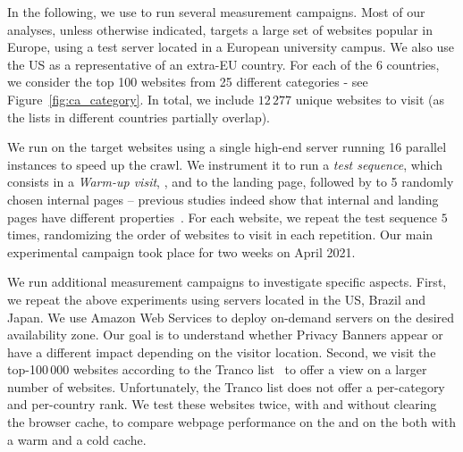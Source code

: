 In the following, we use \TOOL to run several measurement campaigns. Most of our analyses, unless otherwise indicated, targets a large set of websites popular in Europe, using a test server located in a European university campus. We also use the US as a representative of an extra-EU country. For each of the $6$ countries, we consider the top 100 websites from 25 different categories - see Figure~\ref{fig:ca_category}. In total, we include $12\,277$ unique websites to visit (as the lists in different countries partially overlap).

We run \TOOL on the target websites using a single high-end server running 16 parallel instances to speed up the crawl. We instrument it to run a \emph{test sequence}, which consists in a \emph{Warm-up visit}, \BEFORE, and \AFTER to the landing page, followed by \INTERNAL to 5 randomly chosen internal pages -- previous studies indeed show that internal and landing pages have different properties~\cite{aqeel2020on}. For each website, we repeat the test sequence $5$ times, randomizing the order of websites to visit in each repetition.  Our main experimental campaign took place for two weeks on April 2021.

We run additional measurement campaigns to investigate specific aspects. First, we repeat the above experiments using servers located in the US, Brazil and Japan. We use Amazon Web Services to deploy on-demand servers on the desired availability zone. Our goal is to understand whether Privacy Banners appear or have a different impact depending on the visitor location. Second, we visit the top-100\,000 websites according to the Tranco list~\cite{pochat2018tranco} to offer a view on a larger number of websites. Unfortunately, the Tranco list does not offer a per-category and per-country rank. We test these websites twice, with and without clearing the browser cache, to compare webpage performance on the \BEFORE and on the \AFTER both with a warm and a cold cache.

